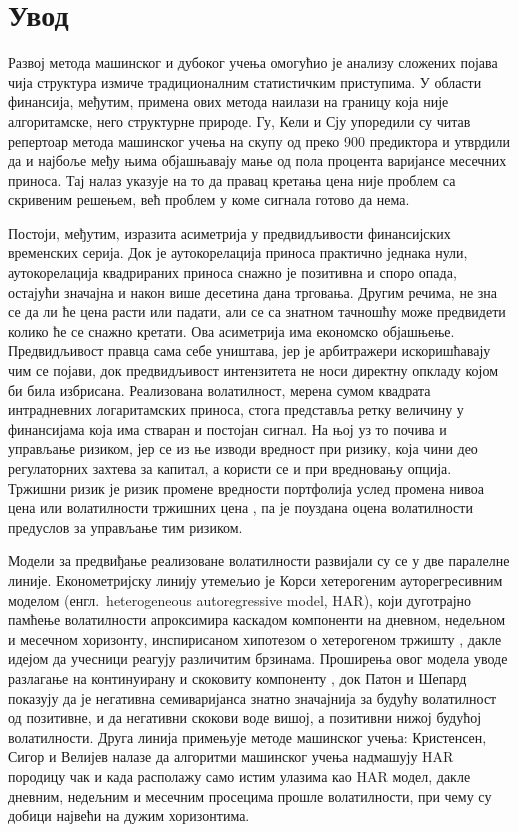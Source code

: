 \chapter{Увод}

Развој метода машинског и дубоког учења омогућио је анализу сложених појава чија
структура измиче традиционалним статистичким приступима. У области финансија,
међутим, примена ових метода наилази на границу која није алгоритамске, него
структурне природе. Гу, Кели и Сју \parencite{guKellyXiu2020} упоредили су читав
репертоар метода машинског учења на скупу од преко 900 предиктора и утврдили да
и најбоље међу њима објашњавају мање од пола процента варијансе месечних приноса.
Тај налаз указује на то да правац кретања цена није проблем са скривеним решењем,
већ проблем у коме сигнала готово да нема.

Постоји, међутим, изразита асиметрија у предвидљивости финансијских временских
серија. Док је аутокорелација приноса практично једнака нули, аутокорелација
квадрираних приноса снажно је позитивна и споро опада, остајући значајна и након више
десетина дана трговања. Другим речима, не зна се да ли ће цена расти или падати,
али се са знатном тачношћу може предвидети колико ће се снажно кретати. Ова асиметрија
има економско објашњење. Предвидљивост правца сама себе уништава, јер је арбитражери
искоришћавају чим се појави, док предвидљивост интензитета не носи директну опкладу
којом би била избрисана. Реализована волатилност, мерена сумом квадрата интрадневних
логаритамских приноса, стога представља ретку величину у финансијама која има стваран
и постојан сигнал. На њој уз то почива и управљање ризиком, јер се из ње изводи
вредност при ризику, која чини део регулаторних захтева за капитал, а користи се и при
вредновању опција. Тржишни ризик је ризик промене вредности портфолија услед промена
нивоа цена или волатилности тржишних цена \parencite{bogojevicArsic2021}, па је
поуздана оцена волатилности предуслов за управљање тим ризиком.

Модели за предвиђање реализоване волатилности развијали су се у две паралелне линије.
Економетријску линију утемељио је Корси \parencite{corsi2009} хетерогеним
ауторегресивним моделом (енгл.\ heterogeneous autoregressive model, HAR), који
дуготрајно памћење волатилности апроксимира каскадом
компоненти на дневном, недељном и месечном хоризонту, инспирисаном хипотезом о
хетерогеном тржишту \parencite{muller1997}, дакле идејом да учесници реагују различитим
брзинама. Проширења овог модела уводе разлагање на континуирану и скоковиту компоненту
\parencite{abd2007}, док Патон и Шепард \parencite{pattonSheppard2015} показују да је
негативна семиваријанса знатно значајнија за будућу волатилност од позитивне, и да
негативни скокови воде вишој, а позитивни нижој будућој волатилности. Друга линија
примењује методе машинског учења: Кристенсен, Сигор и Велијев
\parencite{christensen2023} налазе да алгоритми машинског учења надмашују HAR
породицу чак и када располажу само истим улазима као HAR модел, дакле дневним,
недељним и месечним просецима прошле волатилности, при чему су добици највећи на
дужим хоризонтима.

